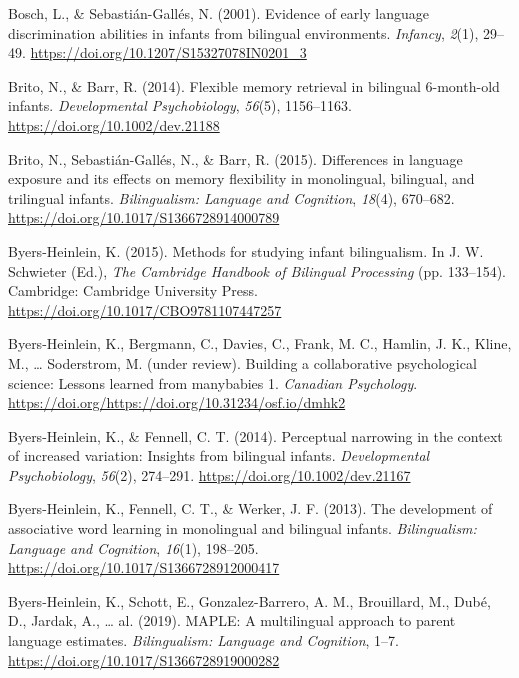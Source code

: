 \documentclass[english,,man,floatsintext]{apa6}
\begin{document}
\leavevmode\hypertarget{ref-bosch_2001}{}%
Bosch, L., \& Sebastián-Gallés, N. (2001). Evidence of early language discrimination abilities in infants from bilingual environments. \emph{Infancy}, \emph{2}(1), 29--49. \url{https://doi.org/10.1207/S15327078IN0201_3}

\leavevmode\hypertarget{ref-brito_2014}{}%
Brito, N., \& Barr, R. (2014). Flexible memory retrieval in bilingual 6-month-old infants. \emph{Developmental Psychobiology}, \emph{56}(5), 1156--1163. \url{https://doi.org/10.1002/dev.21188}

\leavevmode\hypertarget{ref-brito_2015}{}%
Brito, N., Sebastián-Gallés, N., \& Barr, R. (2015). Differences in language exposure and its effects on memory flexibility in monolingual, bilingual, and trilingual infants. \emph{Bilingualism: Language and Cognition}, \emph{18}(4), 670--682. \url{https://doi.org/10.1017/S1366728914000789}

\leavevmode\hypertarget{ref-byers_heinlein_2015}{}%
Byers-Heinlein, K. (2015). Methods for studying infant bilingualism. In J. W. Schwieter (Ed.), \emph{The Cambridge Handbook of Bilingual Processing} (pp. 133--154). Cambridge: Cambridge University Press. \url{https://doi.org/10.1017/CBO9781107447257}

\leavevmode\hypertarget{ref-byers_heinlein_et_al_2019}{}%
Byers-Heinlein, K., Bergmann, C., Davies, C., Frank, M. C., Hamlin, J. K., Kline, M., \ldots{} Soderstrom, M. (under review). Building a collaborative psychological science: Lessons learned from manybabies 1. \emph{Canadian Psychology}. \url{https://doi.org/https://doi.org/10.31234/osf.io/dmhk2}

\leavevmode\hypertarget{ref-byers_heinlein_2014}{}%
Byers-Heinlein, K., \& Fennell, C. T. (2014). Perceptual narrowing in the context of increased variation: Insights from bilingual infants. \emph{Developmental Psychobiology}, \emph{56}(2), 274--291. \url{https://doi.org/10.1002/dev.21167}

\leavevmode\hypertarget{ref-byers_heinlein_2013}{}%
Byers-Heinlein, K., Fennell, C. T., \& Werker, J. F. (2013). The development of associative word learning in monolingual and bilingual infants. \emph{Bilingualism: Language and Cognition}, \emph{16}(1), 198--205. \url{https://doi.org/10.1017/S1366728912000417}

\leavevmode\hypertarget{ref-byers_heinlein_2019}{}%
Byers-Heinlein, K., Schott, E., Gonzalez-Barrero, A. M., Brouillard, M., Dubé, D., Jardak, A., \ldots{} al. (2019). MAPLE: A multilingual approach to parent language estimates. \emph{Bilingualism: Language and Cognition}, 1--7. \url{https://doi.org/10.1017/S1366728919000282}
\end{document}
